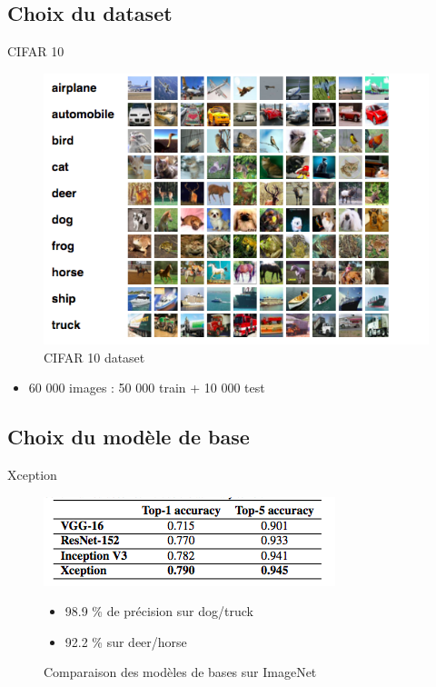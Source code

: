 \documentclass{beamer}
\begin{document}
	\subsection{Choix du dataset}
      \begin{frame}{CIFAR 10}
          \begin{figure}
          \includegraphics[width=.8\textheight]{cifar.png}
          \caption{CIFAR 10 dataset}
          \label{cifar1}
      \end{figure}
      \begin{itemize}
		\item 60 000 images : 50 000 train + 10 000 test
  	  \end{itemize}
    \end{frame}
    
    \subsection{Choix du modèle de base}
    \begin{frame}{Xception}
      \begin{figure}
          \includegraphics[width=.8\textheight]{xception.png}
          \caption{Comparaison des modèles de bases sur ImageNet}
          \label{cifar2}
      \begin{itemize} Sans fine tuning
      	\item 98.9 \% de précision sur dog/truck
        \item 92.2 \% sur deer/horse
      \end{itemize}
      \end{figure}
    \end{frame}
    
\end{document}
